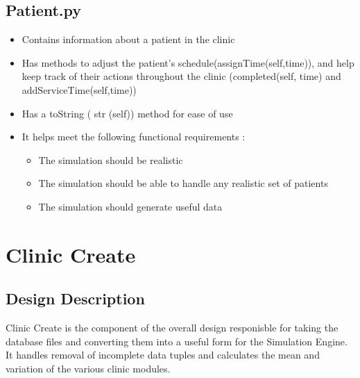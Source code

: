 \documentclass[12pt]{article}
\begin{document}
\subsection{Patient.py}
\begin{itemize}  
\item Contains information about a patient in the clinic
\item Has methods to adjust the patient's schedule(assignTime(self,time)), and help keep track of their actions throughout the clinic (completed(self, time) and addServiceTime(self,time))
\item Has a toString ( str (self)) method for ease of use
\item It helps meet the following functional requirements :
\begin{itemize}
	\item The simulation should be realistic
	\item The simulation should be able to handle any realistic set of patients
	\item The simulation should generate useful data 
\end{itemize}
\end{itemize}

\section{Clinic Create}
\subsection{Design Description}
Clinic Create is the component of the overall design responisble for taking the database files and converting them into a useful form for the Simulation Engine. It handles removal of incomplete data tuples and calculates the mean and variation of the various clinic modules. \\
\end{document}
